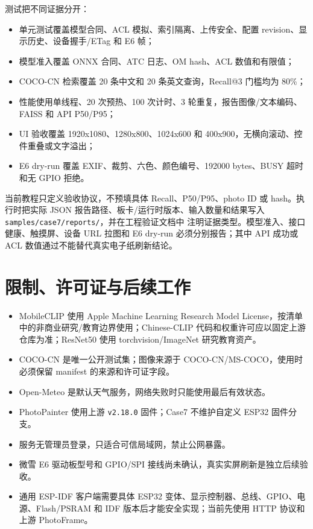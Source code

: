 测试把不同证据分开：

\begin{itemize}
\tightlist
\item
  单元测试覆盖模型合同、ACL 模拟、索引隔离、上传安全、配置
  revision、显示历史、设备握手/ETag 和 E6 帧；
\item
  模型准入覆盖 ONNX 合同、ATC 日志、OM hash、ACL 数值和有限值；
\item
  COCO-CN 检索覆盖 20 条中文和 20 条英文查询，Recall@3 门槛均为 80\%；
\item
  性能使用单线程、20 次预热、100 次计时、3
  轮重复，报告图像/文本编码、FAISS 和 API P50/P95；
\item
  UI 验收覆盖 1920x1080、1280x800、1024x600 和
  400x900，无横向滚动、控件重叠或文字溢出；
\item
  E6 dry-run 覆盖 EXIF、裁剪、六色、颜色编号、192000 bytes、BUSY
  超时和无 GPIO 拒绝。
\end{itemize}

当前教程只定义验收协议，不预填具体 Recall、P50/P95、photo ID 或
hash。执行时把实际 JSON 报告路径、板卡/运行时版本、输入数量和结果写入
\passthrough{\lstinline!samples/case7/reports/!}，并在工程验证文档中
注明证据类型。模型准入、接口健康、触摸屏、设备 URL 拉图和 E6 dry-run
必须分别报告；其中 API 成功或 ACL 数值通过不能替代真实电子纸刷新结论。

\section{限制、许可证与后续工作}\label{ux9650ux5236ux8bb8ux53efux8bc1ux4e0eux540eux7eedux5de5ux4f5c}

\begin{itemize}
\tightlist
\item
  MobileCLIP 使用 Apple Machine Learning Research Model
  License，按清单中的非商业研究/教育边界使用；Chinese-CLIP
  代码和权重许可应以固定上游仓库为准；ResNet50 使用 torchvision/ImageNet
  研究教育资产。
\item
  COCO-CN 是唯一公开测试集；图像来源于 COCO-CN/MS-COCO，使用时必须保留
  manifest 的来源和许可证字段。
\item
  Open-Meteo 是默认天气服务，网络失败时只能使用最后有效状态。
\item
  PhotoPainter 使用上游 \passthrough{\lstinline!v2.18.0!} 固件；Case7
  不维护自定义 ESP32 固件分支。
\item
  服务无管理员登录，只适合可信局域网，禁止公网暴露。
\item
  微雪 E6 驱动板型号和 GPIO/SPI
  接线尚未确认，真实实屏刷新是独立后续验收。
\item
  通用 ESP-IDF 客户端需要具体 ESP32
  变体、显示控制器、总线、GPIO、电源、Flash/PSRAM 和 IDF
  版本后才能安全实现；当前先使用 HTTP 协议和上游 PhotoFrame。
\end{itemize}


